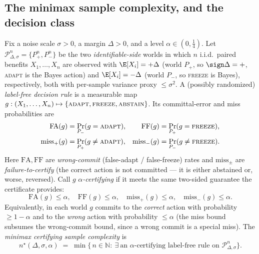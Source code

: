 \subsection{The minimax sample complexity, and the decision class}

\begin{definition}\label{def:certifying}
Fix a noise scale $\sigma>0$, a margin $\Delta>0$, and a level $\alpha\in(0,\tfrac14)$.
Let $\mathcal P^n_{\Delta,\sigma}=\{P^n_{+},P^n_{-}\}$ be the two \emph{identifiable-side} worlds
in which $n$ i.i.d.\ paired benefits $X_1,\dots,X_n$ are observed with
$\E[X_i]=+\Delta$ (world $P_+$, so $\sign\Delta=+$, \textsc{adapt} is the Bayes action) and
$\E[X_i]=-\Delta$ (world $P_-$, so \textsc{freeze} is Bayes), respectively, both with
per-sample variance proxy $\le\sigma^2$. A (possibly randomized) \emph{label-free decision rule}
is a measurable map $g:(X_1,\dots,X_n)\mapsto\{\textsc{adapt},\textsc{freeze},\textsc{abstain}\}$.
Its committal-error and miss probabilities are
\begin{align*}
\mathrm{FA}(g)&=\Pr_{P_-}(g=\textsc{adapt}), &
\mathrm{FF}(g)&=\Pr_{P_+}(g=\textsc{freeze}),\\
\mathrm{miss}_+(g)&=\Pr_{P_+}(g\neq\textsc{adapt}), &
\mathrm{miss}_-(g)&=\Pr_{P_-}(g\neq\textsc{freeze}).
\end{align*}
Here $\mathrm{FA},\mathrm{FF}$ are \emph{wrong-commit} (false-adapt / false-freeze) rates and
$\mathrm{miss}_\pm$ are \emph{failure-to-certify} (the correct action is not committed --- it is
either abstained or, worse, reversed). Call $g$ \emph{$\alpha$-certifying} if it meets the same
two-sided guarantee the certificate provides:
\[
   \mathrm{FA}(g)\le\alpha,\quad \mathrm{FF}(g)\le\alpha,\quad
   \mathrm{miss}_+(g)\le\alpha,\quad \mathrm{miss}_-(g)\le\alpha .
\]
Equivalently, in each world $g$ commits to the \emph{correct} action with probability $\ge1-\alpha$
and to the \emph{wrong} action with probability $\le\alpha$ (the miss bound subsumes the
wrong-commit bound, since a wrong commit is a special miss). The \emph{minimax certifying sample
complexity} is
\[
  n^\star(\Delta,\sigma,\alpha)
  \;=\;\min\big\{\,n\in\mathbb N:\ \exists\ \text{an $\alpha$-certifying label-free rule on }
  \mathcal P^n_{\Delta,\sigma}\big\}.
\]
\end{definition}

